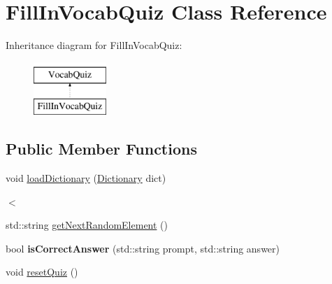 \hypertarget{classFillInVocabQuiz}{
\section{FillInVocabQuiz Class Reference}
\label{classFillInVocabQuiz}
}
Inheritance diagram for FillInVocabQuiz:\begin{figure}[H]
\begin{center}
\leavevmode
\includegraphics[height=2cm]{classFillInVocabQuiz}
\end{center}
\end{figure}
\subsection*{Public Member Functions}
\begin{DoxyCompactItemize}
\item 
void \hyperlink{classFillInVocabQuiz_affe1c2da58f58e96643a5d95bf3a6e47}{loadDictionary} (\hyperlink{classDictionary}{Dictionary} dict)
\begin{DoxyCompactList}\small\item\em $<$ \item\end{DoxyCompactList}\item 
std::string \hyperlink{classFillInVocabQuiz_a551b818f3b29e9c72e44cc9c0ba1c4cb}{getNextRandomElement} ()
\item 
\hypertarget{classFillInVocabQuiz_a191dbe05f92e18f258223f68efbccbe0}{
bool {\bfseries isCorrectAnswer} (std::string prompt, std::string answer)}
\label{classFillInVocabQuiz_a191dbe05f92e18f258223f68efbccbe0}

\item 
void \hyperlink{classFillInVocabQuiz_af0042ea53197503e5a5a6f25dcece8fd}{resetQuiz} ()
\end{DoxyCompactItemize}


